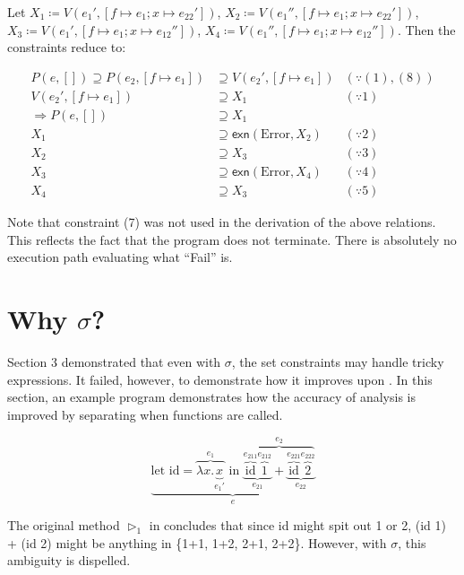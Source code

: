 \documentclass{article}
\begin{document}
Let $X_{1}\coloneq V(e_{1}',[f\mapsto e_{1};x\mapsto e_{22}'])$, $X_{2}\coloneq V(e_{1}'',[f\mapsto e_{1};x\mapsto e_{22}'])$, $X_{3}\coloneq V(e_{1}',[f\mapsto e_{1};x\mapsto e_{12}''])$, $X_{4}\coloneq V(e_{1}'',[f\mapsto e_{1};x\mapsto e_{12}''])$. Then the constraints reduce to:

\begin{align*}
  P(e,[])\supseteq P(e_{2},[f\mapsto e_{1}])&\supseteq V(e_{2}',[f\mapsto e_{1}]) & (\because (1),(8))\\
  V(e_{2}',[f\mapsto e_{1}])&\supseteq X_{1} & (\because 1)\\
  \Rightarrow P(e,[])&\supseteq X_{1} & \\
  X_{1}&\supseteq \mathsf{exn}(\text{Error},X_{2}) & (\because 2)\\
  X_{2}&\supseteq X_{3} & (\because 3)\\
  X_{3}&\supseteq \mathsf{exn}(\text{Error},X_{4}) & (\because 4)\\
  X_{4}&\supseteq X_{3} & (\because 5)
\end{align*}

Note that constraint (7) was not used in the derivation of the above relations. This reflects the fact that the program does not terminate. There is absolutely no execution path evaluating what ``Fail'' is.

\section{Why $\sigma$?}

Section 3 demonstrated that even with $\sigma$, the set constraints may handle tricky expressions.
It failed, however, to demonstrate how it improves upon \cite{YiRyu97}.
In this section, an example program demonstrates how the accuracy of analysis is improved by separating when functions are called.

\[
\underbrace{\text{let id}= \overbrace{\lambda x.\underbrace{x}_{e_{1}'}}^{e_{1}} \text{ in }\overbrace{\underbrace{\overbrace{\text{id}}^{e_{211}}\overbrace{1}^{e_{212}}}_{e_{21}} + \underbrace{\overbrace{\text{id}}^{e_{221}}\overbrace{2}^{e_{222}}}_{e_{22}}}^{e_{2}}}_{e}
\]

The original method $\rhd_{1}$ in \cite{YiRyu97} concludes that since id might spit out 1 or 2, (id 1) + (id 2) might be anything in \{1+1, 1+2, 2+1, 2+2\}. However, with $\sigma$, this ambiguity is dispelled.
\end{document}
